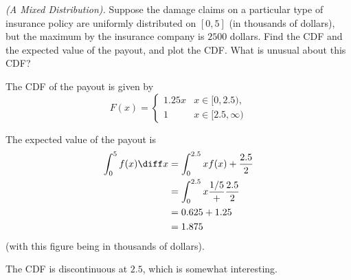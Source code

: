 \begin{problem}[Handout 12, \# 18]
  \emph{(A Mixed Distribution).} Suppose the damage claims on a particular
  type of insurance policy are uniformly distributed on \([0,5]\) (in
  thousands of dollars), but the maximum by the insurance company is
  \(2500\) dollars. Find the CDF and the expected value of the payout, and
  plot the CDF. What is unusual about this CDF?
\end{problem}
\begin{solution}
  The CDF of the payout is given by
  \[
    F(x) =
    \begin{cases}
      1.25x& x \in [0,2.5),\\
      1& x \in [2.5, \infty)
    \end{cases}
  \]

  The expected value of the payout is
  \begin{align*}
    \int_0^5 f(x) \diff x &= \int_0^{2.5} xf(x) + \frac{2.5}{2} \\
                          &= \int_0^{2.5} x\frac{1/5} + \frac{2.5}{2} \\
                          &= 0.625 + 1.25 \\
                          &= 1.875
  \end{align*}
  (with this figure being in thousands of dollars).

  The CDF is discontinuous at $2.5$, which is somewhat interesting.
\end{solution}
\newpage

